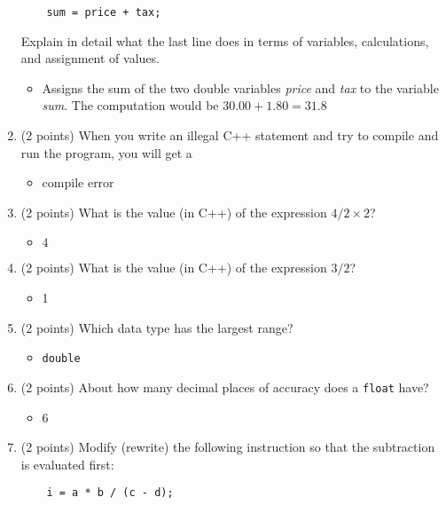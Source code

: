\documentclass{report}
\begin{document}
\begin{enumerate}
\begin{verbatim}
    sum = price + tax;
    \end{verbatim}
    Explain in detail what the last line does in terms of variables, calculations, and assignment of values.
    \begin{itemize}
        \item Assigns the sum of the two double variables \textit{price} and \textit{tax} to the variable \textit{sum}. The computation would be $30.00 + 1.80 = 31.8$
    \end{itemize}
    
    \item (2 points) When you write an illegal C++ statement and try to compile and run the program, you will get a
    \begin{itemize}
        \item compile error
    \end{itemize}
    
    \item (2 points) What is the value (in C++) of the expression \(4 / 2 \times 2\)?
        \begin{itemize}
            \item $4$
        \end{itemize}
    
    \item (2 points) What is the value (in C++) of the expression \(3/2\)?
        \begin{itemize}
            \item 1
        \end{itemize}
    
    \item (2 points) Which data type has the largest range?
    \begin{itemize}
        \item \texttt{double}
    \end{itemize}
    
    \item (2 points) About how many decimal places of accuracy does a \texttt{float} have?
    \begin{itemize}
        \item 6
    \end{itemize}
    
    \item (2 points) Modify (rewrite) the following instruction so that the subtraction is evaluated first:
    \begin{verbatim}
    i = a * b / (c - d);
    \end{verbatim}
\end{enumerate}
\end{document}
